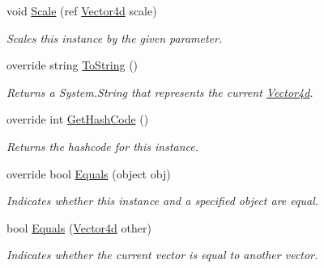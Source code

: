 \begin{DoxyCompactItemize}
void \hyperlink{struct_open_t_k_1_1_vector4d_a6ef85554aea8a2f2c605b494be62e9d3}{Scale} (ref \hyperlink{struct_open_t_k_1_1_vector4d}{Vector4d} scale)
\begin{DoxyCompactList}\small\item\em Scales this instance by the given parameter.\end{DoxyCompactList}\item 
override string \hyperlink{struct_open_t_k_1_1_vector4d_a754fd098d50be956f602aac84f1410df}{To\-String} ()
\begin{DoxyCompactList}\small\item\em Returns a System.\-String that represents the current \hyperlink{struct_open_t_k_1_1_vector4d}{Vector4d}. \end{DoxyCompactList}\item 
override int \hyperlink{struct_open_t_k_1_1_vector4d_a8cd33796bbbd95360cb00e649ecf009e}{Get\-Hash\-Code} ()
\begin{DoxyCompactList}\small\item\em Returns the hashcode for this instance. \end{DoxyCompactList}\item 
override bool \hyperlink{struct_open_t_k_1_1_vector4d_aa4ebd85d8db313a5ef8ab5696e21389b}{Equals} (object obj)
\begin{DoxyCompactList}\small\item\em Indicates whether this instance and a specified object are equal. \end{DoxyCompactList}\item 
bool \hyperlink{struct_open_t_k_1_1_vector4d_aafe80008beb27856cde3985c11a15ed5}{Equals} (\hyperlink{struct_open_t_k_1_1_vector4d}{Vector4d} other)
\begin{DoxyCompactList}\small\item\em Indicates whether the current vector is equal to another vector.\end{DoxyCompactList}\end{DoxyCompactItemize}

